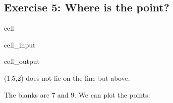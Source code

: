 \documentclass[letterpaper,10pt,english]{jupyterBook}
\begin{document}
\subsection{Exercise 5: Where is the point?}
\label{\detokenize{exercises_unit_4:exercise-5-where-is-the-point}}
\begin{sphinxuseclass}{cell}\begin{sphinxVerbatimInput}

\begin{sphinxuseclass}{cell_input}
\begin{sphinxVerbatim}[commandchars=\\\{\}]
\end{sphinxVerbatim}

\end{sphinxuseclass}\end{sphinxVerbatimInput}
\begin{sphinxVerbatimOutput}

\begin{sphinxuseclass}{cell_output}
\noindent{}

\end{sphinxuseclass}\end{sphinxVerbatimOutput}

\end{sphinxuseclass}
\sphinxAtStartPar
(1.5,2) does not lie on the line but above.

\sphinxAtStartPar
The blanks are 7 and 9. We can plot the points:
\end{document}
